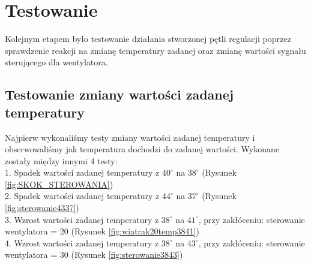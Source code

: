 \documentclass[12pt, a4paper]{article}
\begin{document}
\section{Testowanie}
Kolejnym etapem było testowanie działania stworzonej pętli regulacji poprzez sprawdzenie reakcji na zmianę temperatury zadanej oraz zmianę wartości sygnału sterującego dla wentylatora. 

\subsection{Testowanie zmiany wartości zadanej temperatury}
Najpierw wykonaliśmy testy zmiany wartości zadanej temperatury i obserwowaliśmy jak temperatura dochodzi do zadanej wartości. Wykonane zostały między innymi 4 testy: \\
1. Spadek wartości zadanej temperatury z  $40^\circ$ na $38^\circ$ (Rysunek \ref{fig:SKOK_STEROWANIA}) \\
2. Spadek wartości zadanej temperatury z  $44^\circ$ na $37^\circ$ (Rysunek \ref{fig:sterowanie4337}) \\
3. Wzrost wartości zadanej temperatury z  $38^\circ$ na $41^\circ$, przy zakłóceniu: sterowanie wentylatora = 20 (Rysunek \ref{fig:wiatrak20temp3841}) \\
4. Wzrost wartości zadanej temperatury z  $38^\circ$ na $43^\circ$, przy zakłóceniu: sterowanie wentylatora = 30  (Rysunek \ref{fig:sterowanie3843}) \\
\end{document}
